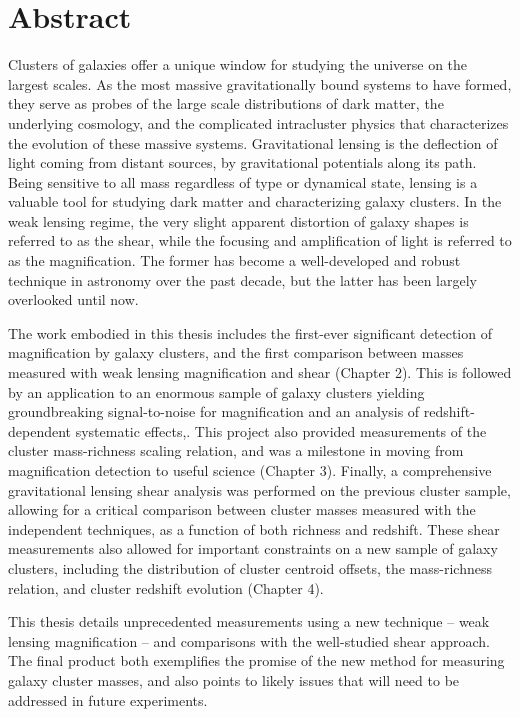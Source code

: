 
\chapter{Abstract}

Clusters of galaxies offer a unique window for studying the universe on the largest scales. As the most massive gravitationally bound systems to have formed, they serve as probes of the large scale distributions of dark matter, the underlying cosmology, and the complicated intracluster physics that characterizes the evolution of these massive systems. Gravitational lensing is the deflection of light coming from distant sources, by gravitational potentials along its path. Being sensitive to all mass regardless of type or dynamical state, lensing is a valuable tool for studying dark matter and characterizing galaxy clusters. In the weak lensing regime, the very slight apparent distortion of galaxy shapes is referred to as the shear, while the focusing and amplification of light is referred to as the magnification. The former has become a well-developed and robust technique in astronomy over the past decade, but the latter has been largely overlooked until now.

The work embodied in this thesis includes the first-ever significant detection of magnification by galaxy clusters, and the first comparison between masses measured with weak lensing magnification and shear (Chapter 2). This is followed by an application to an enormous sample of galaxy clusters yielding groundbreaking signal-to-noise for magnification and an analysis of redshift-dependent systematic effects,. This project also provided measurements of the cluster mass-richness scaling relation, and was a milestone in moving from magnification detection to useful science (Chapter 3). Finally, a comprehensive gravitational lensing shear analysis was performed on the previous cluster sample, allowing for a critical comparison between cluster masses measured with the independent techniques, as a function of both richness and redshift. These shear measurements also allowed for important constraints on a new sample of galaxy clusters, including the distribution of cluster centroid offsets, the mass-richness relation, and cluster redshift evolution (Chapter 4). 

This thesis details unprecedented measurements using a new technique -- weak lensing magnification -- and comparisons with the well-studied shear approach. The final product both exemplifies the promise of the new method for measuring galaxy cluster masses, and also points to likely issues that will need to be addressed in future experiments.

